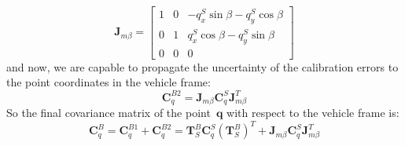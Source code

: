 \begin{equation}
 \mathbf{J}_{m\beta} = 
 \left[
 \begin{array}{ccc}
 1 & 0 & -q^S_x\sin\beta - q^S_y\cos\beta  \\
 0 & 1 &  q^S_x\cos\beta - q^S_y\sin\beta \\
 0 & 0 & 0
 \end{array}
 \right]
\end{equation}
and now, we are capable to propagate the uncertainty of the calibration errors to the point coordinates in the vehicle frame: 
\begin{equation}
 \mathbf{C}^{B2}_q = \mathbf{J}_{m\beta}\mathbf{C}^S_q\mathbf{J}_{m\beta}^T
\end{equation}
So the final covariance matrix of the point~$\mathbf{q}$ with respect to the vehicle frame is:
\begin{equation}
 \mathbf{C}^{B}_q = \mathbf{C}^{B1}_q + \mathbf{C}^{B2}_q = 
    \mathbf{T}^B_S \mathbf{C}^S_q (\mathbf{T}^B_S)^T 
    + 
    \mathbf{J}_{m\beta}\mathbf{C}^S_q\mathbf{J}_{m\beta}^T
\end{equation}

